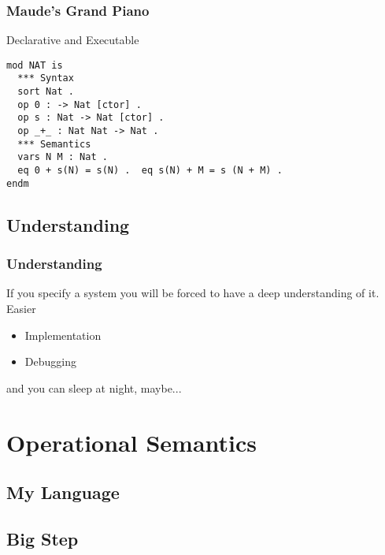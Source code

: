 \documentclass{beamer}
\begin{document}
\begin{frame}[fragile]
	\frametitle{Maude's Grand Piano}
	Declarative and Executable
\begin{verbatim}
mod NAT is
  *** Syntax
  sort Nat .
  op 0 : -> Nat [ctor] .  
  op s : Nat -> Nat [ctor] .  
  op _+_ : Nat Nat -> Nat .
  *** Semantics
  vars N M : Nat .  
  eq 0 + s(N) = s(N) .  eq s(N) + M = s (N + M) .
endm
\end{verbatim}
\end{frame}

\subsection{Understanding}
\begin{frame}
	\frametitle{Understanding}
	If you specify a system you will be forced to have a deep understanding of it. Easier
	\begin{itemize}
	\item Implementation
	\item Debugging
	\end{itemize}
	and you can sleep at night, maybe...
\end{frame}

\section{Operational Semantics}
\subsection{My Language}

\subsection{Big Step}
\end{document}
